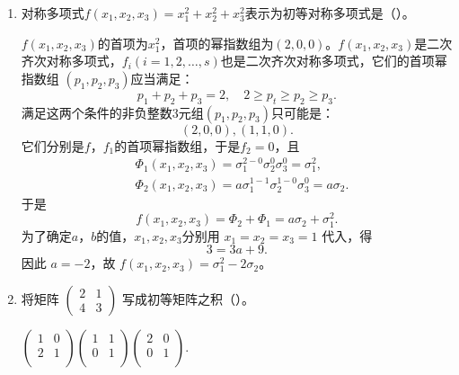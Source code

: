 \begin{enumerate}[1~]
\begin{enumerate}[1.~]
\item
 对称多项式$f \left( x _ { 1 } , x _ { 2 } , x _ { 3 } \right) = x _ { 1 } ^ { 2 } + x _ { 2 } ^ { 2 } + x _ { 3 } ^ { 2 }$表示为初等对称多项式是（\quad）。
 \begin{solution}
$f \left( x _ { 1 } , x _ { 2 } , x _ { 3 } \right)$的首项为$x_1^2$，首项的幂指数组为$(2, 0, 0)$。$f \left( x _ { 1 } , x _ { 2 } , x _ { 3 } \right)$是二次齐次对称多项式，$f_i (i=1, 2, \dots, s)$也是二次齐次对称多项式，它们的首项幂指数组
$(p_1, p_2, p_3)$应当满足：\[
p _ { 1 } + p _ { 2 } + p _ { 3 } = 2 , \quad 2 \geqslant p _ { t } \geqslant p _ { 2 } \geqslant p _ { 3 }.
\]
满足这两个条件的非负整数3元组$(p_1, p_2, p_3)$只可能是：\[
( 2, 0, 0 ) , (1,1,0) .
\]
它们分别是$f$，$f_1$的首项幂指数组，于是$f_2=0$，且
\begin{align*}
& \Phi _ { 1 } \left( x _ { 1 }, x_2 , x _ { 3 } \right) = \sigma _ { 1 } ^ { 2 - 0 } \sigma _ { 2 } ^ { 0 } \sigma _ { 3 } ^ { 0 }  = \sigma _ { 1 } ^ { 2 },  \\ 
&{ \Phi _ { 2 } \left( x _ { 1 }, x_2 , x _ { 3 } \right) = a \sigma _ { 1 } ^ { 1 - 1 } \sigma _ { 2 } ^ { 1 - 0 } \sigma _ { 3 } ^ { 0 } = a \sigma _ { 2 } }.
\end{align*}
于是\[
f(x_1, x_2, x_3)=\Phi_2+\Phi_1=a\sigma_2+\sigma_1^2.
\]
为了确定$a$，$b$的值，$x_1, x_2, x_3$分别用 $x_1=x_2=x_3=1$ 代入，得\[
3=3a+9.
\]
因此 $a=-2$，故 $f(x_1, x_2, x_3)=\sigma_1^2-2\sigma_2$。
 \end{solution}
 
\item
将矩阵 $\left( \begin{smallmatrix} { 2 } & { 1 } \\ { 4 } & { 3 } \end{smallmatrix} \right)$ 写成初等矩阵之积（\quad）。

\begin{solution}
$\left( \begin{matrix}
	1&		0\\
	2&		1\\
\end{matrix} \right) \left( \begin{matrix}
	1&		1\\
	0&		1\\
\end{matrix} \right) \left( \begin{matrix}
	2&		0\\
	0&		1\\
\end{matrix} \right) $.


\end{solution}
\end{enumerate}
\end{enumerate}
